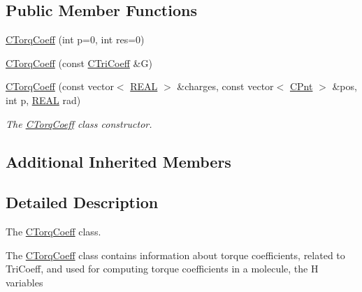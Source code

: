 \subsection*{Public Member Functions}
\begin{DoxyCompactItemize}
\item 
\hyperlink{classCTorqCoeff_a90a2461575ac37a67b70a6b2c3817cf6}{C\-Torq\-Coeff} (int p=0, int res=0)
\item 
\hyperlink{classCTorqCoeff_a247c0abd740c28780ceba265b1201c15}{C\-Torq\-Coeff} (const \hyperlink{classCTriCoeff}{C\-Tri\-Coeff} \&G)
\item 
\hyperlink{classCTorqCoeff_a4c2700efbae3670b13ed1bcea4d990a8}{C\-Torq\-Coeff} (const vector$<$ \hyperlink{util_8h_a5821460e95a0800cf9f24c38915cbbde}{R\-E\-A\-L} $>$ \&charges, const vector$<$ \hyperlink{classCPnt}{C\-Pnt} $>$ \&pos, int p, \hyperlink{util_8h_a5821460e95a0800cf9f24c38915cbbde}{R\-E\-A\-L} rad)
\begin{DoxyCompactList}\small\item\em The \hyperlink{classCTorqCoeff}{C\-Torq\-Coeff} class constructor. \end{DoxyCompactList}\end{DoxyCompactItemize}
\subsection*{Additional Inherited Members}


\subsection{Detailed Description}
The \hyperlink{classCTorqCoeff}{C\-Torq\-Coeff} class. 

The \hyperlink{classCTorqCoeff}{C\-Torq\-Coeff} class contains information about torque coefficients, related to Tri\-Coeff, and used for computing torque coefficients in a molecule, the H variables 


